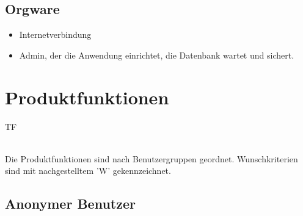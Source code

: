 \documentclass[a4paper]{scrreprt}
\newcounter{Lc}
\newcounter{Hc}
\newcommand{\resetAllCounter}{\setcounter{Lc}{0}\setcounter{Hc}{1}}
\begin{document}
     \section{Orgware}
             \begin{itemize}
               \item Internetverbindung
               \item \gls{Admin}, der die Anwendung einrichtet, die Datenbank wartet
und sichert.
             \end{itemize}

\resetAllCounter
\newcommand{\Func}[1]{\stepcounter{Lc}\textcolor{Blue}{\textbf{/F\arabic{Hc}0-\arabic{Lc}0/} #1} \\}
\newcommand{\FuncW}[1]{\stepcounter{Lc}\textcolor{Green}{\textbf{/F\arabic{Hc}0-\arabic{Lc}0W/} #1} \\}
\newcommand{\FuncBlue}[1]{\textcolor{Blue}{\textbf{#1}}}
\newcommand{\FuncGreen}[1]{\textcolor{Green}{\textbf{#1}}}

\chapter{Produktfunktionen}
\begin{tiny}
	TF\\
\end{tiny}
\ \\
Die Produktfunktionen sind nach Benutzergruppen geordnet. Wunschkriterien sind mit nachgestelltem 'W' gekennzeichnet.
	\section{Anonymer Benutzer}
\end{document}
